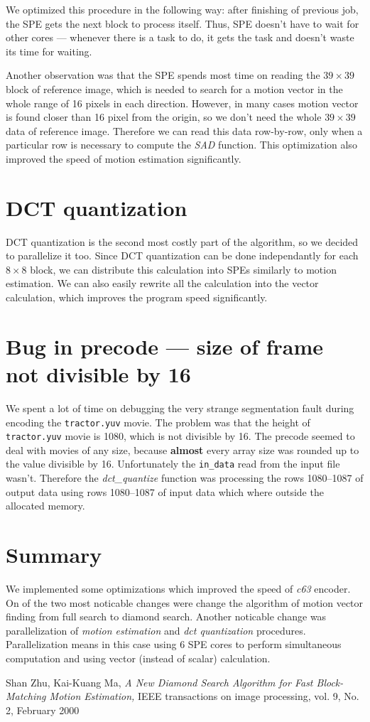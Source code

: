 \documentclass[11pt]{article}
\begin{document}
We optimized this procedure in the following way: after finishing of previous job,
the SPE gets the next block to process itself.
Thus, SPE doesn't have to wait for other cores --- whenever there is a task to do,
it gets the task and doesn't waste its time for waiting.

Another observation was that the SPE spends most time on reading the $39 \times 39$
block of reference image, which is needed to search for a motion vector in the whole
range of 16 pixels in each direction.
However, in many cases motion vector is found closer than 16 pixel from the origin,
so we don't need the whole $39 \times 39$ data of reference image.
Therefore we can read this data row-by-row, only when a particular row is necessary
to compute the \emph{SAD} function.
This optimization also improved the speed of motion estimation significantly.

\section{DCT quantization}
DCT quantization is the second most costly part of the algorithm, so we decided
to parallelize it too.
Since DCT quantization can be done independantly for each $8 \times 8$ block,
we can distribute this calculation into SPEs similarly to motion estimation.
We can also easily rewrite all the calculation into the vector calculation,
which improves the program speed significantly.

\section{Bug in precode --- size of frame not divisible by 16}
We spent a lot of time on debugging the very strange segmentation fault during
encoding the \texttt{tractor.yuv} movie.
The problem was that the height of \texttt{tractor.yuv} movie is 1080, which is
not divisible by 16.
The precode seemed to deal with movies of any size, because \textbf{almost} every
array size was rounded up to the value divisible by 16.
Unfortunately the \texttt{in\_data} read from the input file wasn't.
Therefore the \emph{dct\_quantize} function was processing the rows 1080--1087
of output data using rows 1080--1087 of input data which where outside the allocated
memory.

\section{Summary}
We implemented some optimizations which improved the speed of \emph{c63} encoder.
On of the two most noticable changes were change the algorithm of motion vector finding from full search to diamond search.
Another noticable change was parallelization of \emph{motion estimation} and \emph{dct quantization} procedures.
Parallelization means in this case using 6 SPE cores to perform simultaneous computation and
using vector (instead of scalar) calculation.

\begin{thebibliography}{9}
Shan Zhu, Kai-Kuang Ma,
\emph{A New Diamond Search Algorithm for Fast Block-Matching Motion Estimation,}
IEEE transactions on image processing, vol. 9, No. 2,
February 2000

\end{thebibliography}
\end{document}

